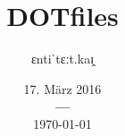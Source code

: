 \documentclass[a4paper,12pt]{article}
\title{\fontspec{Times New Roman}DOTfiles}
\author{\fontspec{Times New Roman}ɛntiˈtɛːt.kaɪ̯}
\date{%
			{\fontspec{Times New Roman}17. März 2016} \\
			{\bf---} \\[0.2\baselineskip]
			\fontspec{Times New Roman}\today}
\begin{document}
		\listoftodos

		\maketitle

		

		\tableofcontents  %
\end{document}
